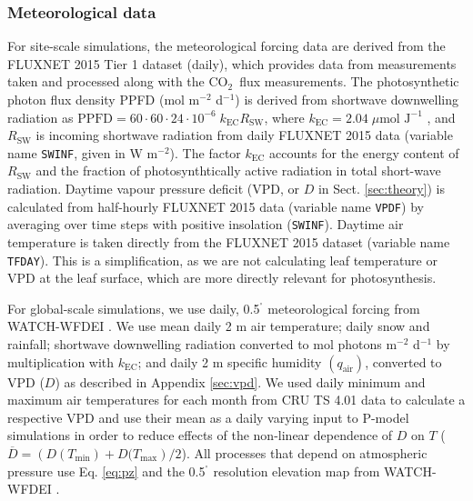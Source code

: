 \documentclass[gmd, manuscript]{copernicus}
\newcommand{\coo}{CO$_2$}
\begin{document}
\subsubsection{Meteorological data}
\label{sec:ppfd}
For site-scale simulations, the meteorological forcing data are derived from the FLUXNET 2015 Tier 1 dataset (daily), which provides data from measurements taken and processed along with the \coo\ flux measurements. The photosynthetic photon flux density PPFD (mol m$^{-2}$ d$^{-1}$) is derived from shortwave downwelling radiation as $\text{PPFD} = 60 \cdot 60 \cdot 24 \cdot 10^{-6} \; k_\text{EC} R_{\text{SW}}$, where $k_\text{EC} = 2.04\; \mu \text{mol J}^{-1}$ \citep{meek84}, and $R_{\text{SW}}$ is incoming shortwave radiation from daily FLUXNET 2015 data (variable name \texttt{SW\textunderscore IN\textunderscore F}, given in W m$^{-2}$). The factor $k_\text{EC}$ accounts for the energy content of $R_\text{SW}$ and the fraction of photosynthtically active radiation in total short-wave radiation. Daytime vapour pressure deficit (VPD, or $D$ in Sect. \ref{sec:theory}) is calculated from half-hourly FLUXNET 2015 data (variable name \texttt{VPD\textunderscore F}) by averaging over time steps with positive insolation (\texttt{SW\textunderscore IN\textunderscore F}). Daytime air temperature is taken directly from the FLUXNET 2015 dataset (variable name \texttt{T\textunderscore F\textunderscore DAY}). This is a simplification, as we are not calculating leaf temperature or VPD at the leaf surface, which are more directly relevant for photosynthesis. %

For global-scale simulations, we use daily, 0.5$^{^\circ}$ meteorological forcing from WATCH-WFDEI \citep{Weedon2014-nv}. We use mean daily 2 m air temperature; daily snow and rainfall; shortwave downwelling radiation converted to mol photons m$^{-2}$ d$^{-1}$ by multiplication with $k_\text{EC}$; and daily 2 m specific humidity $(q_\text{air})$, converted to VPD ($D$) as described in Appendix \ref{sec:vpd}. We used daily minimum and maximum air temperatures for each month from CRU TS 4.01 \citep{harris14} data to calculate a respective VPD and use their mean as a daily varying input to P-model simulations in order to reduce effects of the non-linear dependence of $D$ on $T$ ($\overline{D} = \left( D(T_\text{min}) + D(T_\text{max} \right) / 2$). All processes that depend on atmospheric pressure use Eq. \ref{eq:pz} and the 0.5$^{^\circ}$ resolution elevation map from WATCH-WFDEI \citep{Weedon2014-nv}.
\end{document}

